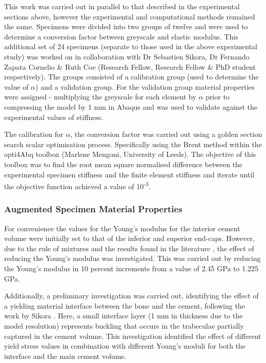This work was carried out in parallel to that described in the experimental
sections above, however the experimental and computational methods remained the
same. Specimens were divided into two groups of twelve  and were used to
determine a conversion factor between greyscale and elastic modulus. This
additional set of 24 specimens (separate to those used in the above
experimental study) was worked on in collaboration with Dr Sebastien Sikora, Dr
Fernando Zapata Cornelio \& Ruth Coe (Research Fellow, Research Fellow \& PhD
student respectively).  The groups consisted of a calibration group (used to
determine the value of $\alpha$) and a validation group. For the validation
group material properties were assigned - multiplying the greyscale for each
element by \(\alpha\) prior to compressing the model by 1 mm in Abaqus and was
used to validate against the experimental values of stiffness.

The calibration for \(\alpha\), the conversion factor was carried out using a
golden section search scalar optimisation process. Specifically using the Brent
method within the opti4Abq toolbox (Marlene Mengoni, University of Leeds). The
objective of this toolbox was to find the root mean square normalised
difference between the experimental specimen stiffness and the finite element
stiffness and iterate until the objective function achieved a value of
10\textsuperscript{-3}.

\subsubsection{Augmented Specimen Material
Properties}\label{augmented-specimen-material-properties}


For convenience the values for the Young's modulus for the interior cement
volume were initially set to that of the inferior and superior end-caps.
However, due to the rule of mixtures and the results found in the literature
\cite{Kinzl2012a,Race2007}, the effect of reducing the Young's modulus was
investigated. This was carried out by reducing the Young's modulus in 10
percent increments from a value of 2.45 GPa to 1.225 GPa.

Additionally, a preliminary investigation was carried out, identifying the
effect of a yielding material interface between the bone and the cement,
following the work by Sikora \cite{Sikora2013a}.  Here, a small interface layer
(1 mm in thickness due to the model resolution) represents buckling that occurs
in the trabeculae partially captured in the cement volume.  This investigation
identified the effect of different yield stress values in combination with
different Young's moduli for both the interface and the main cement volume.

